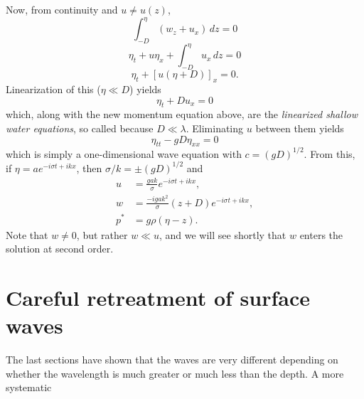 \sourcepagebreak

Now, from continuity and $u\ne u(z)$,
\[
	\int_{-D}^{\eta}(w_z+u_x)\,dz=0
\]
\[
	\eta_t+u\eta_x+\int_{-D}^{\eta}u_x\,dz=0
\]
\[
	\eta_t+[u(\eta+D)]_x=0.
\]
Linearization of this ($\eta\ll D$) yields
\[
	\eta_t+Du_x=0
\]
which, along with the new momentum equation above, are the \emph{linearized shallow water
	equations}, so called because $D\ll\lambda$. Eliminating $u$ between them yields
\[
	\eta_{tt}-gD\eta_{xx}=0
\]
which is simply a one-dimensional wave equation with $c=(gD)^{1/2}$. From this, if
$\eta=ae^{-i\sigma t+ikx}$, then $\sigma/k=\pm(gD)^{1/2}$ and
\begin{align*}
	u   & =\frac{gak}{\sigma}e^{-i\sigma t+ikx},          \\
	w   & =\frac{-igak^2}{\sigma}(z+D)e^{-i\sigma t+ikx}, \\
	p^* & =g\rho(\eta-z).
\end{align*}
Note that $w\ne0$, but rather $w\ll u$, and we will see shortly that $w$ enters the solution
at second order.

\section{Careful retreatment of surface waves}

The last sections have shown that the waves are very different depending on whether
the wavelength is much greater or much less than the depth. A more systematic

\sourcepagebreak

